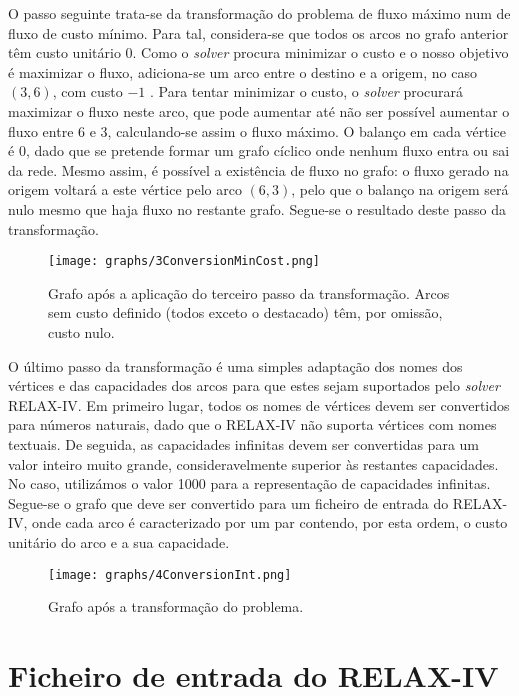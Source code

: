 \documentclass[12pt, a4paper, titlepage]{article}
\begin{document}
O passo seguinte trata-se da transformação do problema de fluxo máximo num de fluxo de custo mínimo.
Para tal, considera-se que todos os arcos no grafo anterior têm custo unitário 0. Como o
\emph{solver} procura minimizar o custo e o nosso objetivo é maximizar o fluxo, adiciona-se um arco
entre o destino e a origem, no caso $(3, 6)$, com custo $-1$ \cite{book}. Para tentar minimizar o
custo, o \emph{solver} procurará maximizar o fluxo neste arco, que pode aumentar até não ser
possível aumentar o fluxo entre 6 e 3, calculando-se assim o fluxo máximo. O balanço em cada vértice
é 0, dado que se pretende formar um grafo cíclico onde nenhum fluxo entra ou sai da rede. Mesmo
assim, é possível a existência de fluxo no grafo: o fluxo gerado na origem voltará a este vértice
pelo arco $(6, 3)$, pelo que o balanço na origem será nulo mesmo que haja fluxo no restante grafo.
Segue-se o resultado deste passo da transformação.

\begin{figure}[H]
    \centering
    \texttt{[image: graphs/3ConversionMinCost.png]}
    \caption{ \onehalfspacing
        Grafo após a aplicação do terceiro passo da transformação. Arcos sem custo definido (todos
        exceto o destacado) têm, por omissão, custo nulo.}
    \label{3conversion-graph}
\end{figure}

O último passo da transformação é uma simples adaptação dos nomes dos vértices e das capacidades dos
arcos para que estes sejam suportados pelo \emph{solver} RELAX-IV. Em primeiro lugar, todos os nomes
de vértices devem ser convertidos para números naturais, dado que o RELAX-IV não suporta vértices
com nomes textuais. De seguida, as capacidades infinitas devem ser convertidas para um valor inteiro
muito grande, consideravelmente superior às restantes capacidades. No caso, utilizámos o valor 1000
para a representação de capacidades infinitas. Segue-se o grafo que deve ser convertido para um
ficheiro de entrada do RELAX-IV, onde cada arco é caracterizado por um par contendo, por esta ordem,
o custo unitário do arco e a sua capacidade.

\begin{figure}[H]
    \centering
    \texttt{[image: graphs/4ConversionInt.png]}
    \caption{Grafo após a transformação do problema.}
    \label{4conversion-graph}
\end{figure}

\section{Ficheiro de entrada do RELAX-IV}

\end{document}
